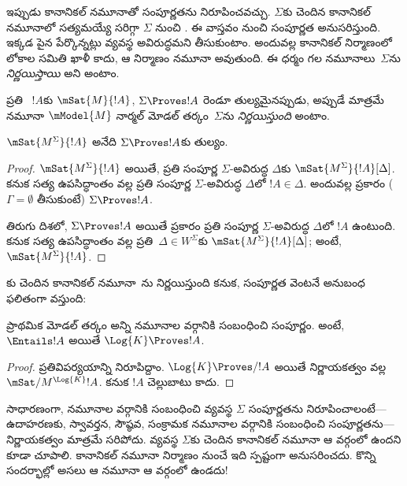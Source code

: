 \documentclass[../../../include/open-logic-section]{subfiles}
\begin{document}


ఇప్పుడు కానానికల్ నమూనాతో సంపూర్ణతను నిరూపించవచ్చు.
$\Sigma$కు చెందిన కానానికల్ నమూనాలో సత్యమయ్యే
 సరిగ్గా $\Sigma$ నుంచి
. ఈ వాస్తవం నుంచి
సంపూర్ణత అనుసరిస్తుంది. ఇక్కడ పైన పేర్కొన్నట్లు
వ్యవస్థ అవిరుద్ధమని తీసుకుంటాం. అందువల్ల కానానికల్ నిర్మాణంలో
లోకాల సమితి ఖాళీ కాదు, ఆ నిర్మాణం నమూనా అవుతుంది.
ఈ ధర్మం గల నమూనాలు~$\Sigma$ను \emph{నిర్ణయిస్తాయి} అని అంటాం.

\begin{defn}
  ప్రతి ~$!A$కు
  $\mSat{M}{!A}$, $\Sigma \Proves !A$ రెండూ
  తుల్యమైనప్పుడు, అప్పుడే మాత్రమే నమూనా $\mModel{M}$ నార్మల్ మోడల్
  తర్కం~$\Sigma$ను \emph{నిర్ణయిస్తుంది} అంటాం.
\end{defn}

\begin{thm}[నిర్ణాయకత్వం]
   $\mSat{M^\Sigma}{!A}$ అనేది
   $\Sigma \Proves !A$కు తుల్యం.
\end{thm}

\begin{proof}
  $\mSat{M^\Sigma}{!A}$ అయితే, ప్రతి సంపూర్ణ
  $\Sigma$-అవిరుద్ధ $\Delta$కు
  $\mSat{M^\Sigma}{!A}[\Delta]$. కనుక సత్య ఉపసిద్ధాంతం వల్ల
  ప్రతి సంపూర్ణ $\Sigma$-అవిరుద్ధ $\Delta$లో $!A \in
  \Delta$. అందువల్ల 
  ప్రకారం ($\Gamma = \emptyset$ తీసుకుంటే)
  $\Sigma \Proves !A$.

  తిరుగు దిశలో, $\Sigma \Proves !A$ అయితే
  ప్రకారం ప్రతి సంపూర్ణ $\Sigma$-అవిరుద్ధ $\Delta$లో
  $!A$ ఉంటుంది. కనుక సత్య ఉపసిద్ధాంతం వల్ల ప్రతి~$\Delta \in
  W^\Sigma$కు $\mSat{M^\Sigma}{!A}[\Delta]$; అంటే,
  $\mSat{M^\Sigma}{!A}$.
\end{proof}

కు చెందిన కానానికల్ నమూనా~ను నిర్ణయిస్తుంది
కనుక,  సంపూర్ణత వెంటనే అనుబంధ ఫలితంగా వస్తుంది:

\begin{cor}
  ప్రాథమిక మోడల్ తర్కం  అన్ని నమూనాల వర్గానికి
  సంబంధించి సంపూర్ణం. అంటే, $\Entails !A$ అయితే
  $\Log{K} \Proves !A$.
\end{cor}

\begin{proof}
  ప్రతివిపర్యయాన్ని నిరూపిద్దాం. $\Log{K} \Proves/ !A$ అయితే నిర్ణాయకత్వం
  వల్ల $\mSat/{M^{\Log{K}}}{!A}$. కనుక $!A$ చెల్లుబాటు కాదు.
\end{proof}

సాధారణంగా, నమూనాల వర్గానికి సంబంధించి వ్యవస్థ $\Sigma$ సంపూర్ణతను
నిరూపించాలంటే---ఉదాహరణకు, స్వావర్తన, సౌష్ఠవ,
సంక్రామక నమూనాల వర్గానికి సంబంధించి 
సంపూర్ణతను---నిర్ణాయకత్వం మాత్రమే సరిపోదు. వ్యవస్థ
$\Sigma$కు చెందిన కానానికల్ నమూనా ఆ వర్గంలో ఉందని కూడా
చూపాలి. కానానికల్ నమూనా నిర్మాణం నుంచే ఇది స్పష్టంగా
అనుసరించదు. కొన్ని సందర్భాల్లో అసలు ఆ నమూనా ఆ వర్గంలో ఉండదు!
\end{document}
